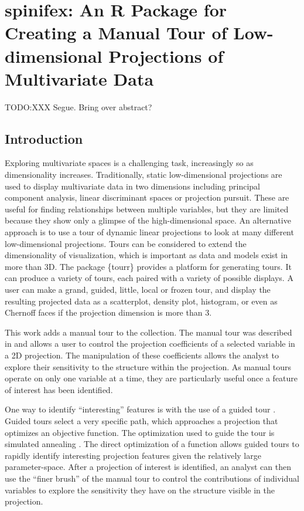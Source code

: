 \documentclass{template/monashthesis}
\begin{document}
\hypertarget{ch:spinifex}{%
\chapter{spinifex: An R Package for Creating a Manual Tour of Low-dimensional Projections of Multivariate Data}\label{ch:spinifex}}

TODO:XXX Segue. Bring over abstract?

\hypertarget{introduction}{%
\section{Introduction}\label{introduction}}

Exploring multivariate spaces is a challenging task, increasingly so as dimensionality increases. Traditionally, static low-dimensional projections are used to display multivariate data in two dimensions including principal component analysis, linear discriminant spaces or projection pursuit. These are useful for finding relationships between multiple variables, but they are limited because they show only a glimpse of the high-dimensional space. An alternative approach is to use a tour \autocite{asimov_grand_1985} of dynamic linear projections to look at many different low-dimensional projections. Tours can be considered to extend the dimensionality of visualization, which is important as data and models exist in more than 3D. The package \{tourr\} \autocite{wickham_tourr:_2011} provides a platform for generating tours. It can produce a variety of tours, each paired with a variety of possible displays. A user can make a grand, guided, little, local or frozen tour, and display the resulting projected data as a scatterplot, density plot, histogram, or even as Chernoff faces if the projection dimension is more than 3.

This work adds a manual tour to the collection. The manual tour was described in \textcite{cook_manual_1997} and allows a user to control the projection coefficients of a selected variable in a 2D projection. The manipulation of these coefficients allows the analyst to explore their sensitivity to the structure within the projection. As manual tours operate on only one variable at a time, they are particularly useful once a feature of interest has been identified.

One way to identify ``interesting'' features is with the use of a guided tour \autocite{cook_grand_1995}. Guided tours select a very specific path, which approaches a projection that optimizes an objective function. The optimization used to guide the tour is simulated annealing \autocite{kirkpatrick_optimization_1983}. The direct optimization of a function allows guided tours to rapidly identify interesting projection features given the relatively large parameter-space. After a projection of interest is identified, an analyst can then use the ``finer brush'' of the manual tour to control the contributions of individual variables to explore the sensitivity they have on the structure visible in the projection.
\end{document}
